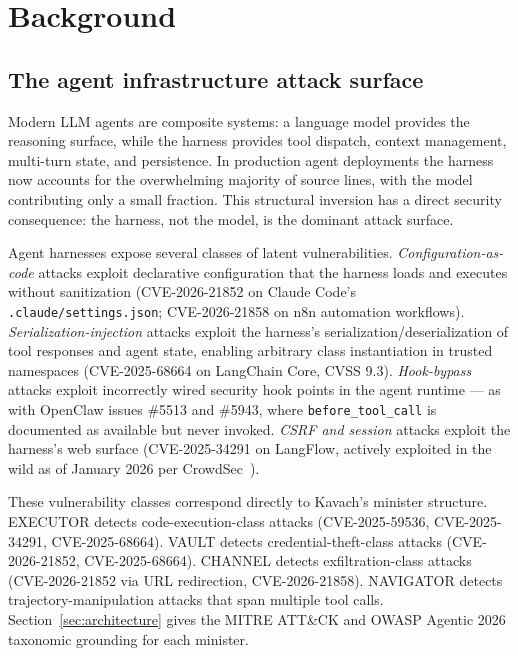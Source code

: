\documentclass[sigconf,anonymous,review]{acmart}
\begin{document}

\section{Background}
\label{sec:background}

\subsection{The agent infrastructure attack surface}

Modern LLM agents are composite systems: a language model provides the
reasoning surface, while the harness provides tool dispatch, context management,
multi-turn state, and persistence. In production agent deployments the harness
now accounts for the overwhelming majority of source lines, with the model
contributing only a small fraction. This structural inversion has a direct
security consequence: the harness, not the model, is the dominant attack
surface.

Agent harnesses expose several classes of latent vulnerabilities.
\emph{Configuration-as-code} attacks exploit declarative configuration that
the harness loads and executes without sanitization (CVE-2026-21852 on Claude
Code's \texttt{.claude/settings.json}; CVE-2026-21858 on n8n automation
workflows). \emph{Serialization-injection} attacks exploit the harness's
serialization/deserialization of tool responses and agent state, enabling
arbitrary class instantiation in trusted namespaces (CVE-2025-68664 on
LangChain Core, CVSS 9.3). \emph{Hook-bypass} attacks exploit incorrectly
wired security hook points in the agent runtime — as with OpenClaw issues
\#5513 and \#5943, where \texttt{before\_tool\_call} is documented as available
but never invoked. \emph{CSRF and session} attacks exploit the harness's web
surface (CVE-2025-34291 on LangFlow, actively exploited in the wild as of
January 2026 per CrowdSec~\cite{crowdsec2026langflow}).

These vulnerability classes correspond directly to Kavach's minister structure.
EXECUTOR detects code-execution-class attacks (CVE-2025-59536, CVE-2025-34291,
CVE-2025-68664). VAULT detects credential-theft-class attacks (CVE-2026-21852,
CVE-2025-68664). CHANNEL detects exfiltration-class attacks (CVE-2026-21852
via URL redirection, CVE-2026-21858). NAVIGATOR detects trajectory-manipulation
attacks that span multiple tool calls. Section~\ref{sec:architecture} gives the
MITRE ATT\&CK and OWASP Agentic 2026 taxonomic grounding for each minister.
\end{document}
